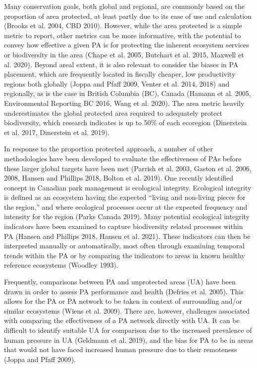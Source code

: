 \documentclass[10pt,oneside]{article}
\begin{document}
Many conservation goals, both global and regional, are commonly based on
the proportion of area protected, at least partly due to its ease of use
and calculation (Brooks et al. 2004, CBD 2010). However, while the area
protected is a simple metric to report, other metrics can be more
informative, with the potential to convey how effective a given PA is
for protecting the inherent ecosystem services or biodiversity in the
area (Chape et al. 2005, Butchart et al. 2015, Maxwell et al. 2020).
Beyond areal extent, it is also relevant to consider the biases in PA
placement, which are frequently located in fiscally cheaper, low
productivity regions both globally (Joppa and Pfaff 2009, Venter et al.
2014, 2018) and regionally, as is the case in British Columbia (BC),
Canada (Hamann et al. 2005, Environmental Reporting BC 2016, Wang et al.
2020). The area metric heavily underestimates the global protected area
required to adequately protect biodiversity, which research indicates is
up to 50\% of each ecoregion (Dinerstein et al. 2017, Dinerstein et al.
2019).

In response to the proportion protected approach, a number of other
methodologies have been developed to evaluate the effectiveness of PAs
before these larger global targets have been met (Parrish et al. 2003,
Gaston et al. 2006, 2008, Hansen and Phillips 2018, Bolton et al. 2019).
One recently identified concept in Canadian park management is
ecological integrity. Ecological integrity is defined as an ecosystem
having the expected ``living and non-living pieces for the region,'' and
where ecological processes occur at the expected frequency and intensity
for the region (Parks Canada 2019). Many potential ecological integrity
indicators have been examined to capture biodiversity related processes
within PA (Hansen and Phillips 2018, Hansen et al. 2021). These
indicators can then be interpreted manually or automatically, most often
through examining temporal trends within the PA or by comparing the
indicators to areas in known healthy reference ecosystems (Woodley
1993).

Frequently, comparisons between PA and unprotected areas (UA) have been
drawn in order to assess PA performance and health (Defries et al.
2005). This allows for the PA or PA network to be taken in context of
surrounding and/or similar ecosystems (Wiens et al. 2009). There are,
however, challenges associated with comparing the effectiveness of a PA
network directly with UA. It can be difficult to identify suitable UA
for comparison due to the increased prevalence of human pressure in UA
(Geldmann et al. 2019), and the bias for PA to be in areas that would
not have faced increased human pressure due to their remoteness (Joppa
and Pfaff 2009).
\end{document}
